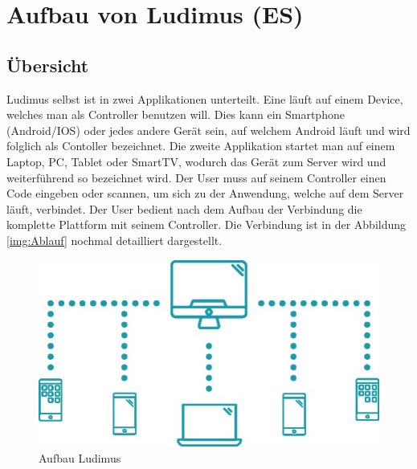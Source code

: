 \section{Aufbau von Ludimus (ES)}
\subsection{Übersicht}
Ludimus selbst ist in zwei Applikationen unterteilt. Eine läuft auf einem Device, welches man als Controller benutzen will.
Dies kann ein Smartphone (Android/IOS) oder jedes andere Gerät sein, auf welchem Android läuft und wird folglich als Contoller bezeichnet. Die zweite Applikation startet man auf einem Laptop, PC, Tablet oder SmartTV, wodurch das Gerät zum Server wird und weiterführend so bezeichnet wird. Der User muss auf seinem Controller einen Code eingeben oder scannen, um sich zu der Anwendung, welche auf dem Server läuft, verbindet. Der User bedient nach dem Aufbau der Verbindung die komplette Plattform mit seinem Controller. Die Verbindung ist in der Abbildung \ref{img:Ablauf} nochmal detailliert dargestellt.
\begin{figure}
    \includegraphics[scale=0.6]{images/ludi.jpg}
    \caption{Aufbau Ludimus}
    \label{img:Aufbau}
\end{figure}
\pagebreak
